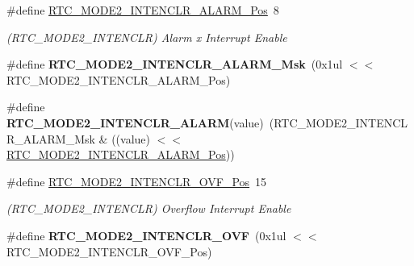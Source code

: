 \begin{DoxyCompactItemize}
\item 
\hypertarget{group___s_a_m_l21___r_t_c_ga220b6cbf531e52eb6388252b9f0d0426}{}\#define \hyperlink{group___s_a_m_l21___r_t_c_ga220b6cbf531e52eb6388252b9f0d0426}{R\+T\+C\+\_\+\+M\+O\+D\+E2\+\_\+\+I\+N\+T\+E\+N\+C\+L\+R\+\_\+\+A\+L\+A\+R\+M\+\_\+\+Pos}~8\label{group___s_a_m_l21___r_t_c_ga220b6cbf531e52eb6388252b9f0d0426}

\begin{DoxyCompactList}\small\item\em (R\+T\+C\+\_\+\+M\+O\+D\+E2\+\_\+\+I\+N\+T\+E\+N\+C\+L\+R) Alarm x Interrupt Enable \end{DoxyCompactList}\item 
\hypertarget{group___s_a_m_l21___r_t_c_gad142bbe72f2abcfb18a59dd5c388434e}{}\#define {\bfseries R\+T\+C\+\_\+\+M\+O\+D\+E2\+\_\+\+I\+N\+T\+E\+N\+C\+L\+R\+\_\+\+A\+L\+A\+R\+M\+\_\+\+Msk}~(0x1ul $<$$<$ R\+T\+C\+\_\+\+M\+O\+D\+E2\+\_\+\+I\+N\+T\+E\+N\+C\+L\+R\+\_\+\+A\+L\+A\+R\+M\+\_\+\+Pos)\label{group___s_a_m_l21___r_t_c_gad142bbe72f2abcfb18a59dd5c388434e}

\item 
\hypertarget{group___s_a_m_l21___r_t_c_ga9310bf2d8f141aae039d9a87be695dcf}{}\#define {\bfseries R\+T\+C\+\_\+\+M\+O\+D\+E2\+\_\+\+I\+N\+T\+E\+N\+C\+L\+R\+\_\+\+A\+L\+A\+R\+M}(value)~(R\+T\+C\+\_\+\+M\+O\+D\+E2\+\_\+\+I\+N\+T\+E\+N\+C\+L\+R\+\_\+\+A\+L\+A\+R\+M\+\_\+\+Msk \& ((value) $<$$<$ \hyperlink{group___s_a_m_l21___r_t_c_ga220b6cbf531e52eb6388252b9f0d0426}{R\+T\+C\+\_\+\+M\+O\+D\+E2\+\_\+\+I\+N\+T\+E\+N\+C\+L\+R\+\_\+\+A\+L\+A\+R\+M\+\_\+\+Pos}))\label{group___s_a_m_l21___r_t_c_ga9310bf2d8f141aae039d9a87be695dcf}

\item 
\hypertarget{group___s_a_m_l21___r_t_c_ga80a362eccdf6500ade445ccfac078275}{}\#define \hyperlink{group___s_a_m_l21___r_t_c_ga80a362eccdf6500ade445ccfac078275}{R\+T\+C\+\_\+\+M\+O\+D\+E2\+\_\+\+I\+N\+T\+E\+N\+C\+L\+R\+\_\+\+O\+V\+F\+\_\+\+Pos}~15\label{group___s_a_m_l21___r_t_c_ga80a362eccdf6500ade445ccfac078275}

\begin{DoxyCompactList}\small\item\em (R\+T\+C\+\_\+\+M\+O\+D\+E2\+\_\+\+I\+N\+T\+E\+N\+C\+L\+R) Overflow Interrupt Enable \end{DoxyCompactList}\item 
\hypertarget{group___s_a_m_l21___r_t_c_ga79a550af9a9eba73f6f3a12ff0be2667}{}\#define {\bfseries R\+T\+C\+\_\+\+M\+O\+D\+E2\+\_\+\+I\+N\+T\+E\+N\+C\+L\+R\+\_\+\+O\+V\+F}~(0x1ul $<$$<$ R\+T\+C\+\_\+\+M\+O\+D\+E2\+\_\+\+I\+N\+T\+E\+N\+C\+L\+R\+\_\+\+O\+V\+F\+\_\+\+Pos)\label{group___s_a_m_l21___r_t_c_ga79a550af9a9eba73f6f3a12ff0be2667}


\end{DoxyCompactItemize}
